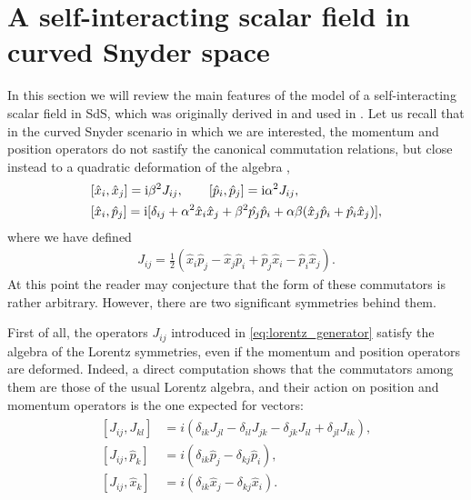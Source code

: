 \documentclass[a4paper,10pt]{amsart}
\begin{document}
\section{A self-interacting scalar field in curved Snyder space}\label{sec:model}
In this section we will review the main features of the model of a self-interacting scalar field in SdS,
which was originally derived in \cite{Franchino-Vinas:2019nqy} and used in \cite{Franchino-Vinas:2019lyi}.
Let us recall that in the curved Snyder scenario in which we are interested,
the momentum and position operators do not sastify the canonical commutation relations, but close instead to a quadratic deformation of the algebra
\cite{KowalskiGlikman:2004kp},
 \begin{align}\label{eq:phase_space}
\begin{split}
 &[\hat{x}_i,\hat{x}_j]={\rm i}\beta^2 J_{ij},\qquad [\hat{p}_i,\hat{p}_j]={\rm i}\alpha^2 J_{ij},\\
 &[\hat{x}_i,\hat{p}_j]={\rm i}[\delta_{ij}+\alpha^2 \hat{x}_i\hat{x}_j+\beta^2\hat{p_j}\hat{p}_i+\alpha\beta (\hat{x}_j\hat{p}_i+\hat{p_i}\hat{x}_j)],
 \end{split}
\end{align}
where we have defined
\begin{align}\label{eq:lorentz_generator}
 J_{ij}=\frac{1}{2}(\hat x_i\hat p_j-\hat x_j\hat p_i+\hat p_j\hat x_i-\hat p_i\hat x_j).
\end{align}
At this point the reader may conjecture that the form of these commutators is rather arbitrary.
However, there are two significant symmetries behind them.

First of all, the operators $J_{ij}$ introduced in \eqref{eq:lorentz_generator} satisfy the algebra of the
Lorentz symmetries, even if the momentum and position operators are deformed.
Indeed, a direct computation shows that the commutators among them are those of the usual Lorentz algebra,
and their action on position and momentum operators is the one expected for vectors:
\begin{align}\label{eq:lorentz_action}
 \begin{split}
[J_{ij}, J_{kl}]&=i (\delta_{ik}J_{jl}-\delta_{il}J_{jk}-\delta_{jk}J_{il}+\delta_{jl}J_{ik}),\\
 [J_{ij}, \hat{p}_{k}]&=i (\delta_{ik} \hat{p}_{j}-\delta_{kj} \hat{p}_{i}),\\
 [J_{ij}, \hat{x}_{k}]&=i (\delta_{ik} \hat{x}_{j}-\delta_{kj} \hat{x}_{i}).
 \end{split}
 \end{align}
\end{document}
